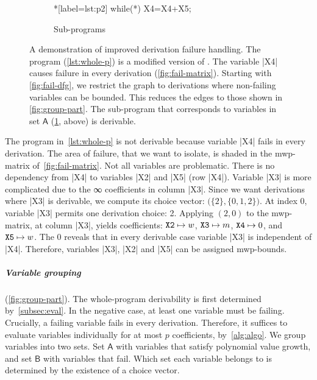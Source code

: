 \begin{figure}
\begin{subfigure}{\textwidth}
{\hspace{2em}%
\begin{minipage}{.35\textwidth}
\begin{implisting}*[label={lst:p2}]
while(*) {
  X4=X4+X5;
}
\end{implisting}
\end{minipage}
\caption{Sub-programs}\label{lst:sub-progs}
}\end{subfigure}
\caption[A demonstration of improved derivation failure handling]{
A demonstration of improved derivation failure handling.
The program (\ref{lst:whole-p}) is a modified version of \exname.
The variable \pr|X4| causes failure in every derivation (\ref{fig:fail-matrix}).
Starting with \ref{fig:fail-dfg}, we restrict the graph to derivations where non-failing variables can be bounded.
This reduces the edges to those shown in \ref{fig:group-part}.
The sub-program that corresponds to variables in set \(\mathsf{A}\) (\ref{lst:sub-progs}, above) is derivable.
}\label{fig:part-prog}
\end{figure}

\begin{example}\label{ex:whl}
The program in~\autoref{lst:whole-p} is not derivable because variable \pr|X4| fails in every derivation.
The area of failure, that we want to isolate, is shaded in the mwp-matrix of~\autoref{fig:fail-matrix}.
Not all variables are problematic.
There is no dependency from \pr|X4| to variables \pr|X2| and \pr|X5| (row \pr|X4|).
Variable \pr|X3| is more complicated due to the ∞ coefficients in column \pr|X3|.
Since we want derivations where \pr|X3| is derivable, we compute its choice vector: \(\big(\{2\}, \{0,1,2\}\big)\).
At index 0, variable \pr|X3| permits one derivation choice: 2.
Applying \((2,0)\) to the mwp-matrix, at column \pr|X3|, yields coefficients:
\(\text{\pr|X2|} \mapsto w\),
\(\text{\pr|X3|} \mapsto m\),
\(\text{\pr|X4|} \mapsto 0\), and
\(\text{\pr|X5|} \mapsto w\).
The \(0\) reveals that in every derivable case variable \pr|X3| is independent of \pr|X4|.
Therefore, variables \pr|X3|, \pr|X2| and \pr|X5| can be assigned mwp-bounds.
\end{example}

\subparagraph*{Variable grouping} (\autoref{fig:group-part}).
The whole-program derivability is first determined by~\autoref{subsec:eval}.
In the negative case, at least one variable must be failing.
Crucially, a failing variable fails in {every derivation}.
Therefore, it suffices to evaluate variables individually for at most \(p\) coefficients, by~\autoref{alg:algo}.
We group variables into two sets.
Set \(\mathsf{A}\) with variables that satisfy polynomial value growth, and set \(\mathsf{B}\) with variables that fail.
Which set each variable belongs to is determined by the existence of a choice vector.

